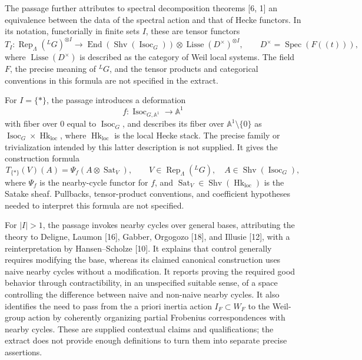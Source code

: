 \documentclass[11pt]{article}
\begin{document}
The passage further attributes to spectral decomposition theorems [6, 1] an equivalence between the data of the spectral action and that of Hecke functors. In its notation, functorially in finite sets \(I\), these are tensor functors
\[
T_I\colon
\operatorname{Rep}_{\Lambda}({}^{L}G)^{\otimes I}
\longrightarrow
\operatorname{End}(\operatorname{Shv}(\operatorname{Isoc}_G))
\otimes\operatorname{Lisse}(D^{\times})^{\otimes I},
\qquad D^{\times}=\operatorname{Spec}(F((t))),
\]
where \(\operatorname{Lisse}(D^{\times})\) is described as the category of Weil local systems. The field \(F\), the precise meaning of \({}^{L}G\), and the tensor products and categorical conventions in this formula are not specified in the extract.

For \(I=\{\ast\}\), the passage introduces a deformation
\[
f\colon\operatorname{Isoc}_{G,\mathbb A^1}\longrightarrow\mathbb A^1
\]
with fiber over \(0\) equal to \(\operatorname{Isoc}_G\), and describes its fiber over \(\mathbb A^1\setminus\{0\}\) as \(\operatorname{Isoc}_G\times\operatorname{Hk}_{\mathrm{loc}}\), where \(\operatorname{Hk}_{\mathrm{loc}}\) is the local Hecke stack. The precise family or trivialization intended by this latter description is not supplied. It gives the construction formula
\[
T_{\{\ast\}}(V)(A)
=\Psi_f(A\otimes\operatorname{Sat}_V),
\qquad
V\in\operatorname{Rep}_{\Lambda}({}^{L}G),\quad
A\in\operatorname{Shv}(\operatorname{Isoc}_G),
\]
where \(\Psi_f\) is the nearby-cycle functor for \(f\), and \(\operatorname{Sat}_V\in\operatorname{Shv}(\operatorname{Hk}_{\mathrm{loc}})\) is the Satake sheaf. Pullbacks, tensor-product conventions, and coefficient hypotheses needed to interpret this formula are not specified.

For \(|I|>1\), the passage invokes nearby cycles over general bases, attributing the theory to Deligne, Laumon [16], Gabber, Orgogozo [18], and Illusie [12], with a reinterpretation by Hansen--Scholze [10]. It explains that control generally requires modifying the base, whereas its claimed canonical construction uses naive nearby cycles without a modification. It reports proving the required good behavior through contractibility, in an unspecified suitable sense, of a space controlling the difference between naive and non-naive nearby cycles. It also identifies the need to pass from the a priori inertia action \(I_F\subset W_F\) to the Weil-group action by coherently organizing partial Frobenius correspondences with nearby cycles. These are supplied contextual claims and qualifications; the extract does not provide enough definitions to turn them into separate precise assertions.
\end{document}
